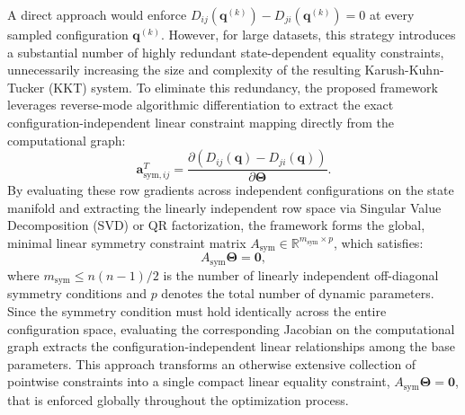 \documentclass[lettersize,journal]{IEEEtran}
\begin{document}
A direct approach would enforce $D_{ij}(\bm{q}^{(k)}) - D_{ji}(\bm{q}^{(k)}) = 0$ at every sampled configuration $\bm{q}^{(k)}$. However, for large datasets, this strategy introduces a substantial number of highly redundant state-dependent equality constraints, unnecessarily increasing the size and complexity of the resulting Karush-Kuhn-Tucker (KKT) system. To eliminate this redundancy, the proposed framework leverages reverse-mode algorithmic differentiation to extract the exact configuration-independent linear constraint mapping directly from the computational graph:
\begin{equation}
    \bm{a}_{\mathrm{sym}, ij}^T = \frac{\partial \left( D_{ij}(\bm{q}) - D_{ji}(\bm{q}) \right)}{\partial \bm{\Theta}}.
    \label{eq:sym_row}
\end{equation}
By evaluating these row gradients across independent configurations on the state manifold and extracting the linearly independent row space via Singular Value Decomposition (SVD) or QR factorization, the framework forms the global, minimal linear symmetry constraint matrix $A_{\mathrm{sym}} \in \mathbb{R}^{m_{\mathrm{sym}} \times p}$, which satisfies:
\begin{equation}
    A_{\mathrm{sym}} \bm{\Theta} = \mathbf{0},
    \label{eq:sym_constraint}
\end{equation}
where $m_{\mathrm{sym}} \le n(n-1)/2$ is the number of linearly independent off-diagonal symmetry conditions and $p$ denotes the total number of dynamic parameters. Since the symmetry condition must hold identically across the entire configuration space, evaluating the corresponding Jacobian on the computational graph extracts the configuration-independent linear relationships among the base parameters. This approach transforms an otherwise extensive collection of pointwise constraints into a single compact linear equality constraint, $A_{\mathrm{sym}} \bm{\Theta} = \mathbf{0}$, that is enforced globally throughout the optimization process.
\end{document}
